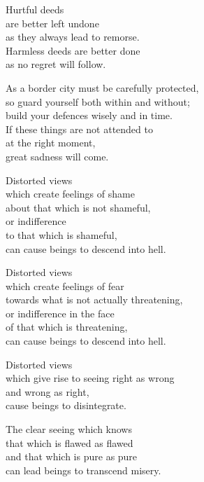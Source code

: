 Hurtful deeds\\
are better left undone\\
as they always lead to remorse.\\
Harmless deeds are better done\\
as no regret will follow.


As a border city must be carefully protected,\\
so guard yourself both within and without;\\
build your defences wisely and in time.\\
If these things are not attended to\\
at the right moment,\\
great sadness will come.


Distorted views\\
which create feelings of shame\\
about that which is not shameful,\\
or indifference\\
to that which is shameful,\\
can cause beings to descend into hell.


Distorted views\\
which create feelings of fear\\
towards what is not actually threatening,\\
or indifference in the face\\
of that which is threatening,\\
can cause beings to descend into hell.


Distorted views\\
which give rise to seeing right as wrong\\
and wrong as right,\\
cause beings to disintegrate.


The clear seeing which knows\\
that which is flawed as flawed\\
and that which is pure as pure\\
can lead beings to transcend misery.

